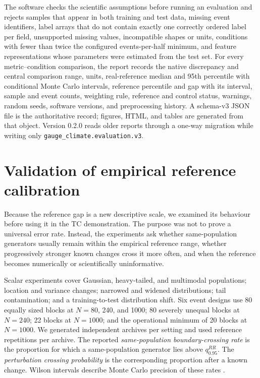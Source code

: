 \documentclass[gmd, manuscript]{copernicus}
\begin{document}
The software checks the scientific assumptions before running an evaluation and
rejects samples that appear in both training and test data, missing event identifiers,
label arrays that do not contain exactly one correctly ordered label per field,
unsupported missing values, incompatible
shapes or units, conditions with fewer than twice the configured events-per-half
minimum,
and feature representations whose parameters were estimated from the test set. For every
metric--condition comparison, the report records the native discrepancy and central
comparison range, units, real-reference median and 95th percentile with conditional
Monte Carlo intervals, reference percentile and gap with its interval, sample and
event counts, weighting rule, reference and control status, warnings, random seeds,
software versions, and preprocessing history. A schema-v3 JSON file is the
authoritative record; figures, HTML, and tables are generated from that object.
Version 0.2.0 reads older reports through a one-way migration while writing only
\texttt{gauge\_climate.evaluation.v3}.

\section{Validation of empirical reference calibration}
\label{sec:validation}

Because the reference gap is a new descriptive scale, we examined its behaviour
before using it in the TC demonstration. The purpose was not to prove a universal
error rate. Instead, the experiments ask whether same-population generators usually
remain within the empirical reference range, whether progressively stronger known
changes cross it more often, and when the reference becomes numerically or
scientifically uninformative.

Scalar experiments cover Gaussian, heavy-tailed, and multimodal populations; location
and variance changes; narrowed and widened distributions; tail contamination; and a
training-to-test distribution shift. Six event designs use 80 equally sized blocks at
\(N=80\), 240, and 1000; 80 severely unequal blocks at \(N=240\); 22 blocks at
\(N=1000\); and the operational minimum of 20 blocks at \(N=1000\). We generated
\ValidationTrials{} independent archives per setting and used
\ValidationReferenceRepetitions{} reference repetitions per archive. The reported
\emph{same-population boundary-crossing rate} is the proportion for which a
same-population generator lies above \(q_{0.95}^{RR}\). The
\emph{perturbation crossing probability} is the corresponding proportion after a
known change. Wilson intervals describe Monte Carlo precision of these rates
\citep{Wilson1927}.
\end{document}
